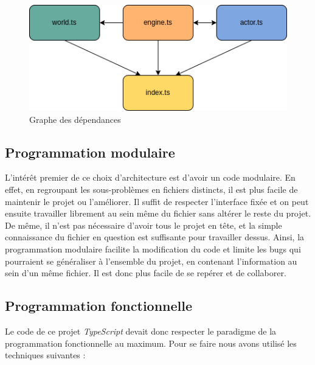 \documentclass{article}
\begin{document}
\begin{figure}[!h]
    \centering
    \includegraphics[width=13cm]{depend_js.drawio.png}
    \caption{Graphe des dépendances}
    \label{fig:depend}
\end{figure}

\newpage
\subsection{Programmation modulaire}
L’intérêt premier de ce choix d’architecture est d’avoir un code modulaire. En effet, en regroupant les sous-problèmes en fichiers distincts, il est plus facile de maintenir le projet ou l’améliorer. Il
suffit de respecter l’interface fixée et on peut ensuite travailler librement au sein même du fichier
sans altérer le reste du projet. De même, il n’est pas nécessaire d’avoir tous le projet en tête, et la
simple connaissance du fichier en question est suffisante pour travailler dessus.
Ainsi, la programmation modulaire facilite la modification du code et limite les bugs qui pourraient se généraliser à l’ensemble du projet, en contenant l’information au sein d’un même fichier. Il est
donc plus facile de se repérer et de collaborer.

\vspace{1cm}
\subsection{Programmation fonctionnelle}
Le code de ce projet \textit{TypeScript} devait donc respecter le paradigme de la programmation fonctionnelle au maximum. Pour se faire nous avons utilisé les techniques suivantes :
\vspace{0.5cm}
\end{document}
